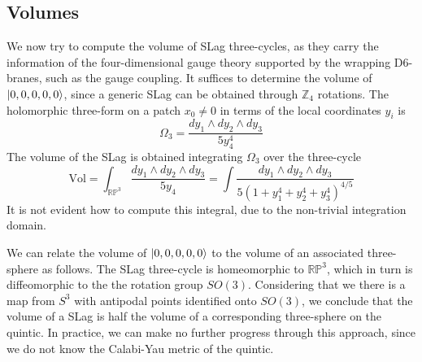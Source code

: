 \subsection{Volumes}
We now try to compute the volume of SLag three-cycles, as they carry the information of the four-dimensional
gauge theory supported by the wrapping D$6$-branes, such as the gauge coupling.
It suffices to determine the volume of $\ket{0,0,0,0,0}$, since a generic SLag can be obtained through $\mathbb Z_4$ rotations.
The holomorphic three-form on a patch $x_0\neq0$ in terms of the local coordinates $y_i$ is
\begin{equation}
  \Omega_3=\frac{dy_1\wedge dy_2\wedge dy_3}{5y_4^4}
\end{equation}
The volume of the SLag is obtained integrating $\Omega_3$ over the three-cycle
\begin{equation}
  \mathrm{Vol}=\int_{\mathbb{RP}^3}\frac{dy_1\wedge dy_2\wedge dy_3}{5 y_4}=
\int \frac{dy_1\wedge dy_2\wedge dy_3}{5(1+y_1^4+y_2^4+y_3^4)^{4/5}}
\label{eq:int}
\end{equation}
It is not evident how to compute this integral, due to the non-trivial integration domain.

We can relate the volume of $\ket{0,0,0,0,0}$ to the volume of an associated three-sphere as follows.
The SLag three-cycle is homeomorphic to $\mathbb{RP}^3$, which in turn is diffeomorphic to the
the rotation group $SO(3)$. 
Considering that we there is a map from $S^3$ with antipodal points identified onto $SO(3)$,
we conclude that the volume of a SLag is half the volume of a corresponding three-sphere on the quintic.
In practice, we can make no further progress through this approach, since we do not know
the Calabi-Yau metric of the quintic.

%
%

